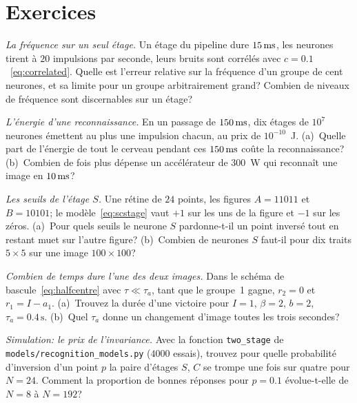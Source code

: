 \section{Exercices}

\begin{exercise}[\lvlA]
\label{ex:12:1}
\emph{La fréquence sur un seul étage.} Un étage du pipeline dure $15\,\text{ms}$, les neurones tirent à $20$ impulsions par seconde, leurs bruits sont corrélés avec $c=0.1$~\eqref{eq:correlated}. Quelle est l'erreur relative sur la fréquence d'un groupe de cent neurones, et sa limite pour un groupe arbitrairement grand? Combien de niveaux de fréquence sont discernables sur un étage?
\end{exercise}

\begin{exercise}[\lvlA]
\label{ex:12:2}
\emph{L'énergie d'une reconnaissance.} En un passage de $150\,\text{ms}$, dix étages de $10^7$ neurones émettent au plus une impulsion chacun, au prix de $10^{-10}$~J. (a)~Quelle part de l'énergie de tout le cerveau pendant ces $150\,\text{ms}$ coûte la reconnaissance? (b)~Combien de fois plus dépense un accélérateur de $300$~W qui reconnaît une image en $10\,\text{ms}$?
\end{exercise}

\begin{exercise}[\lvlB]
\label{ex:12:3}
\emph{Les seuils de l'étage $S$.} Une \og rétine\fg{} de $24$ points, les figures $A=11011$ et $B=10101$; le modèle~\eqref{eq:scstage} vaut $+1$ sur les uns de la figure et $-1$ sur les zéros. (a)~Pour quels seuils le neurone $S$ pardonne-t-il un point inversé tout en restant muet sur l'autre figure? (b)~Combien de neurones $S$ faut-il pour dix traits $5\times5$ sur une image $100\times100$?
\end{exercise}

\begin{exercise}[\lvlB]
\label{ex:12:4}
\emph{Combien de temps dure l'une des deux images.} Dans le schéma de bascule~\eqref{eq:halfcentre} avec $\tau\ll\tau_a$, tant que le groupe~1 gagne, $r_2=0$ et $r_1=I-a_1$. (a)~Trouvez la durée d'une victoire pour $I=1$, $\beta=2$, $b=2$, $\tau_a=0.4\,\text{s}$. (b)~Quel $\tau_a$ donne un changement d'image toutes les trois secondes?
\end{exercise}

\begin{exercise}[\lvlB]
\label{ex:12:5}
\emph{Simulation: le prix de l'invariance.} Avec la fonction \texttt{two\_stage} de \texttt{models/\allowbreak recognition\_models.py} ($4000$ essais), trouvez pour quelle probabilité d'inversion d'un point $p$ la paire d'étages $S$, $C$ se trompe une fois sur quatre pour $N=24$. Comment la proportion de bonnes réponses pour $p=0.1$ évolue-t-elle de $N=8$ à $N=192$?
\end{exercise}

